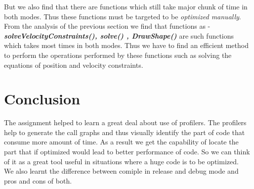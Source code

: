 \documentclass[11pt,]{article}
\begin{document}
\begin{singlespace}
But we also find that there are functions which still take major chunk of time in both modes. Thus these functions must be targeted to be \emph{optimized manually}.
From the analysis of the previous section we find that functions as - \textbf{\emph{solveVelocityConstraints(), solve() , DrawShape()}} are such functions 
which takes most times in both modes. Thus we have to find an efficient method to perform the operations performed by these functions such as 
solving the equations of position and velocity constraints.

\section{Conclusion}
The assignment helped to learn a great deal about use of profilers. The profilers help to generate the call graphs and thus visually identify the
part of code that consume more amount of time. As a result we get the capability of locate the part that if optimized would lead to better 
performance of code. So we can think of it as a great tool useful in situations where a huge code is to be optimized. \\

We also learnt the difference between comiple in release and debug mode and pros and cons of both.


\end{singlespace}
\end{document}
